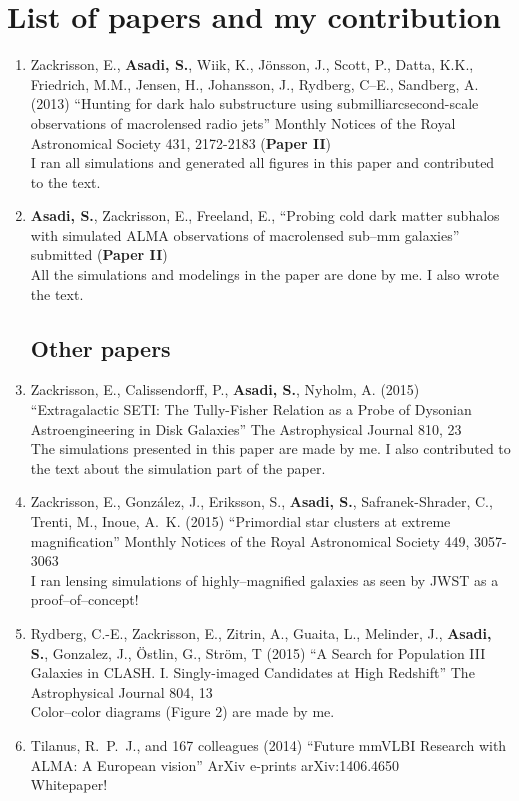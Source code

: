 \documentclass[a4wide,12pt]{book}
\begin{document}
{\clearpage

\thispagestyle{empty}

\section*{List of papers and my contribution}
  \begin{enumerate}[I]
    \subsection*{Included in this thesis}
      \item
      Zackrisson, E., {\bf Asadi, S.}, Wiik, K., J{\"o}nsson, J., Scott, P., Datta, K.K., Friedrich, M.M., Jensen, H., Johansson, J., Rydberg, C--E., Sandberg, A. (2013) ``Hunting for dark halo substructure using  submilliarcsecond-scale observations of macrolensed radio jets'' Monthly Notices of the Royal Astronomical Society 431, 2172-2183 ({\bf Paper II})\\
      I ran all simulations and generated all figures in this paper and contributed to the text.
      \item 
      {\bf Asadi, S.}, Zackrisson, E., Freeland, E., ``Probing cold dark matter subhalos with simulated ALMA observations of macrolensed sub–mm galaxies'' submitted ({\bf Paper II})\\
      All the simulations and modelings in the paper are done by me. I also wrote the text.
    \subsection*{Other papers}
      \item
      Zackrisson, E., Calissendorff, P., {\bf Asadi, S.}, Nyholm, A. (2015) ``Extragalactic SETI: The Tully-Fisher Relation as a Probe of Dysonian Astroengineering in Disk Galaxies'' The Astrophysical Journal 810, 23 \\
      The simulations presented in this paper are made by me. I also contributed to the text about the simulation part of the paper.
      \item
      Zackrisson, E., Gonz{\'a}lez, J., Eriksson, S., {\bf Asadi, S.}, Safranek-Shrader, C., Trenti, M., Inoue, A.~K. (2015) ``Primordial star clusters at extreme magnification'' Monthly Notices of the Royal Astronomical Society 449, 3057-3063\\
      I ran lensing simulations of highly--magnified galaxies as seen by JWST as a proof--of--concept!
      \item 
      Rydberg, C.-E., Zackrisson, E., Zitrin, A., Guaita, L., Melinder, J., {\bf Asadi, S.}, Gonzalez, J., {\"O}stlin, G., Str{\"o}m, T (2015) ``A Search for Population III Galaxies in CLASH. I. Singly-imaged Candidates at High Redshift'' The Astrophysical Journal 804, 13\\
      Color--color diagrams (Figure 2) are made by me.
      \item 
      Tilanus, R.~P.~J., and 167 colleagues (2014) ``Future mmVLBI Research with ALMA: A European vision'' ArXiv e-prints arXiv:1406.4650\\
      Whitepaper!
  \end{enumerate}

}
\end{document}
